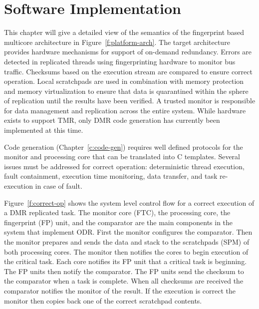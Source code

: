 
\chapter{Software Implementation} %

\label{c:soft-impl} %

	This chapter will give a detailed view of the semantics of the fingerprint based multicore architecture in Figure~\ref{f:platform-arch}.
	The target architecture provides hardware mechanisms for support of on-demand redundancy. 		
	Errors are detected in replicated threads using fingerprinting hardware to monitor bus traffic. 	
	Checksums based on the execution stream are compared to ensure correct operation.
	Local scratchpads are used in combination with memory protection and memory virtualization to ensure that data is quarantined within the sphere of replication until the results have been verified.
	A trusted monitor is responsible for data management and replication across the entire system.
	While hardware exists to support TMR, only DMR code generation has currently been implemented at this time. 
	
	Code generation (Chapter~\ref{c:code-gen}) requires well defined protocols for the monitor and processing core that can be translated into C templates. 
	Several issues must be addressed for correct operation: deterministic thread execution, fault containment, execution time monitoring, data transfer, and task re-execution in case of fault. 
		
	Figure~\ref{f:correct-op} shows the system level control flow for a correct execution of a DMR replicated task.
	The monitor core (FTC), the processing core, the fingerprint (FP) unit, and the comparator are the main components in the system that implement ODR. 
	First the monitor configures the comparator. 
	Then the monitor prepares and sends the data and stack to the scratchpads (SPM) of both processing cores. 
	The monitor then notifies the cores to begin execution of the critical task. 
	Each core notifies its FP unit that a critical task is beginning. 
	The FP units then notify the comparator. 
	The FP units send the checksum to the comparator when a task is complete. 
	When all checksums are received the comparator notifies the monitor of the result. 
	If the execution is correct the monitor then copies back one of the correct scratchpad contents. 




